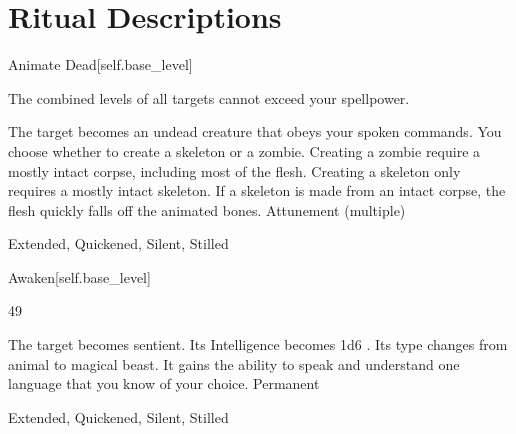 \section{Ritual Descriptions}
\begin{spellsection}{Animate Dead}[self.base_level]
\begin{spellheader}
\end{spellheader}
\begin{spellcontent}
\begin{spelltargetinginfo}
\spellspecial The combined levels of all targets cannot exceed your spellpower.
\end{spelltargetinginfo}
\begin{spelleffects}
\spelleffect
The target becomes an undead creature that obeys your spoken commands.
You choose whether to create a skeleton or a zombie.
Creating a zombie require a mostly intact corpse, including most of the flesh.
Creating a skeleton only requires a mostly intact skeleton.
If a skeleton is made from an intact corpse, the flesh quickly falls off the animated bones.
\spelldur Attunement (multiple)
\end{spelleffects}
\end{spellcontent}
\begin{spellfooter}
 Extended, Quickened, Silent, Stilled
\end{spellfooter}
\begin{spellsubcontent}
\end{spellsubcontent}
\end{spellsection}
\begin{spellsection}{Awaken}[self.base_level]
\begin{spellcontent}
\begin{spelltargetinginfo}
 49
\end{spelltargetinginfo}
\begin{spelleffects}
\spelleffect
The target becomes sentient.
Its Intelligence becomes 1d6 .
Its type changes from animal to magical beast.
It gains the ability to speak and understand one language that you know of your choice.
\spelldur Permanent
\end{spelleffects}
\end{spellcontent}
\begin{spellfooter}
 Extended, Quickened, Silent, Stilled
\end{spellfooter}
\begin{spellsubcontent}
\end{spellsubcontent}
\end{spellsection}
